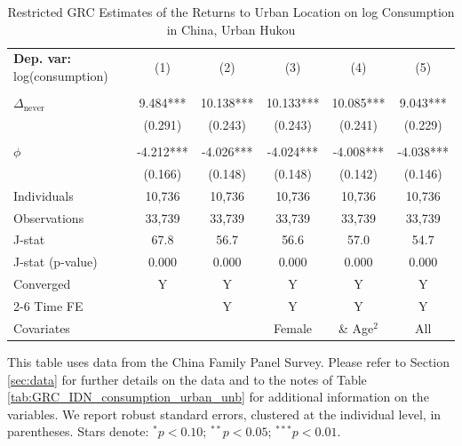 \begin{table}[htbp] \centering \begin{threeparttable}
 \caption{Restricted GRC Estimates of the Returns to Urban Location on log Consumption in China, Urban Hukou} 
 \label{tab:GRC_CHN_urban_consumption_urban_unb_u} 
\begin{tabular}{l ccccc} \toprule  \textbf{Dep. var:}  log(consumption) 
                    &\multicolumn{1}{c}{(1)}   &\multicolumn{1}{c}{(2)}   &\multicolumn{1}{c}{(3)}   &\multicolumn{1}{c}{(4)}   &\multicolumn{1}{c}{(5)}   \\
                    &               &               &               &               &               \\
\addlinespace
$\Delta_{\text{never}}$&       9.484***&      10.138***&      10.133***&      10.085***&       9.043***\\
                    &     (0.291)   &     (0.243)   &     (0.243)   &     (0.241)   &     (0.229)   \\
                    &               &               &               &               &               \\
\addlinespace
$\phi$              &      -4.212***&      -4.026***&      -4.024***&      -4.008***&      -4.038***\\
                    &     (0.166)   &     (0.148)   &     (0.148)   &     (0.142)   &     (0.146)   \\
\addlinespace
Individuals         &      10,736   &      10,736   &      10,736   &      10,736   &      10,736   \\
Observations        &      33,739   &      33,739   &      33,739   &      33,739   &      33,739   \\
J-stat              &        67.8   &        56.7   &        56.6   &        57.0   &        54.7   \\
J-stat (p-value)    &       0.000   &       0.000   &       0.000   &       0.000   &       0.000   \\
Converged           &           Y   &           Y   &           Y   &           Y   &           Y   \\
\cmidrule{2-6} Time FE & & Y & Y & Y & Y \\ Covariates & & & Female & \& Age$^2$ & All \\ \bottomrule \end{tabular} \begin{tablenotes}[flushleft] \footnotesize \item{This table uses data from the China Family Panel Survey. Please refer to Section \ref{sec:data} for further details on the data and to the notes of Table \ref{tab:GRC_IDN_consumption_urban_unb} for additional information on the variables. We report robust standard errors, clustered at the individual level, in parentheses. Stars denote: $^{*} p<0.10$; $^{**} p<0.05$; $^{***} p<0.01$.} \end{tablenotes} \end{threeparttable} \end{table}
